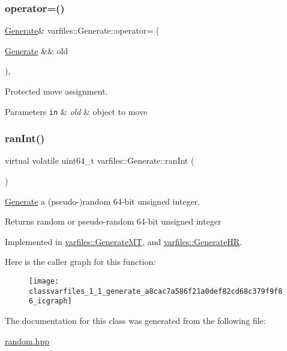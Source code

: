\subsubsection{\texorpdfstring{operator=()}{operator=()}\hspace{0.1cm}{\footnotesize\ttfamily [2/2]}}
{\footnotesize\ttfamily \hyperlink{classvarfiles_1_1_generate}{Generate}\& varfiles\+::\+Generate\+::operator= (\begin{DoxyParamCaption}\item[{\hyperlink{classvarfiles_1_1_generate}{Generate} \&\&}]{old }\end{DoxyParamCaption})\hspace{0.3cm}{\ttfamily [protected]}, {\ttfamily [default]}}



Protected move assignment. 


\begin{DoxyParams}[1]{Parameters}
\mbox{\tt in}  & {\em old} & object to move \\
\hline
\end{DoxyParams}
\mbox{\label{classvarfiles_1_1_generate_a8cac7a586f21a0def82cd68c379f9f86}} 
\subsubsection{\texorpdfstring{ran\+Int()}{ranInt()}}
{\footnotesize\ttfamily virtual volatile uint64\+\_\+t varfiles\+::\+Generate\+::ran\+Int (\begin{DoxyParamCaption}{ }\end{DoxyParamCaption})\hspace{0.3cm}{\ttfamily [pure virtual]}}



\hyperlink{classvarfiles_1_1_generate}{Generate} a (pseudo-\/)random 64-\/bit unsigned integer. 

\begin{DoxyReturn}{Returns}
random or pseudo-\/random 64-\/bit unsigned integer 
\end{DoxyReturn}


Implemented in \hyperlink{classvarfiles_1_1_generate_m_t_a500e163265b6fdae0a30fdacc1c37f80}{varfiles\+::\+Generate\+MT}, and \hyperlink{classvarfiles_1_1_generate_h_r_ac0c560c9ea17bc67470124040e0bd796}{varfiles\+::\+Generate\+HR}.

Here is the caller graph for this function\+:\nopagebreak
\begin{figure}[H]
\begin{center}
\leavevmode
\texttt{[image: classvarfiles\_1\_1\_generate\_a8cac7a586f21a0def82cd68c379f9f86\_icgraph]}
\end{center}
\end{figure}


The documentation for this class was generated from the following file\+:\begin{DoxyCompactItemize}
\item 
\hyperlink{random_8hpp}{random.\+hpp}\end{DoxyCompactItemize}
